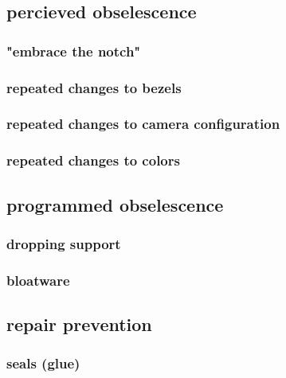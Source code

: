 \documentclass[letterpaper]{article}
\begin{document}
\subsection{percieved obselescence}
\label{sec:org0e03162}
\subsubsection{"embrace the notch"}
\label{sec:orgc9c8abb}
\subsubsection{repeated changes to bezels}
\label{sec:orgc6f98a6}
\subsubsection{repeated changes to camera configuration}
\label{sec:org1e1528e}
\subsubsection{repeated changes to colors}
\label{sec:org7a3d165}
\subsection{programmed obselescence}
\label{sec:org144a9f9}
\subsubsection{dropping support}
\label{sec:org51f4269}
\subsubsection{bloatware}
\label{sec:org8e98d9d}
\subsection{repair prevention}
\label{sec:org7c6c6fc}
\subsubsection{seals (glue)}
\label{sec:org91afc1b}
\end{document}
